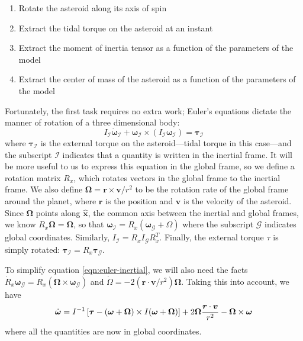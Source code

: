 \documentclass[aps,twocolumn,secnumarabic,balancelastpage,amsmath,amssymb,nofootinbib,floatfix]{revtex4-1}
\begin{document}
\begin{enumerate}
    \item Rotate the asteroid along its axis of spin
    \item Extract the tidal torque on the asteroid at an instant
    \item Extract the moment of inertia tensor as a function of the parameters of the model
    \item Extract the center of mass of the asteroid as a function of the parameters of the model
\end{enumerate}
Fortunately, the first task requires no extra work; Euler's equations dictate the manner of rotation of a three dimensional body:
\begin{equation}
    I_\mathcal{I}\dot{\bm{\omega}}_\mathcal{I} + \bm \omega_\mathcal{I} \times (I_\mathcal{I}\bm \omega_\mathcal{I}) = \bm \tau_\mathcal{I}
    \label{eqn:euler-inertial}
\end{equation}
where $\bm \tau_\mathcal{I}$ is the external torque on the asteroid---tidal torque in this case---and the subscript $\mathcal I$ indicates that a quantity is written in the inertial frame. It will be more useful to us to express this equation in the global frame, so we define a rotation matrix $R_x$, which rotates vectors in the global frame to the inertial frame. We also define $\bm \Omega = \bm r \times \bm v/ r^2$ to be the rotation rate of the global frame around the planet, where $\bm r$ is the position and $\bm v$ is the velocity of the asteroid. Since $\bm \Omega$ points along $\hat{\bm x}$, the common axis between the inertial and global frames, we know $R_x \bm\Omega = \bm\Omega$, so that $\bm \omega_\mathcal{I} = R_x(\bm \omega_\mathcal{G} + \Omega)$ where the subscript $\mathcal G$ indicates global coordinates. Similarly, $I_\mathcal{I} = R_x I_\mathcal{G}R_x^T$. Finally, the external torque $\tau$ is simply rotated: $\bm \tau_\mathcal{I} = R_x \bm \tau_\mathcal{G}$.

To simplify equation \ref{eqn:euler-inertial}, we will also need the facts $\dot R_x\bm\omega_\mathcal{G}=R_x(\bm\Omega\times\bm\omega_\mathcal{G})$ and $\dot \Omega = -2(\bm r \cdot \bm v / r^2)\bm \Omega$. Taking this into account, we have
\begin{equation}
    \dot{\bm{\omega}} = I^{-1}\left[ \bm \tau - (\bm \omega + \bm \Omega) \times I (\bm \omega + \bm \Omega) \right] + 2 \bm \Omega \frac{\bm r \cdot \bm v}{r^2} - \bm \Omega \times \bm \omega
\end{equation}
where all the quantities are now in global coordinates.
\end{document}

